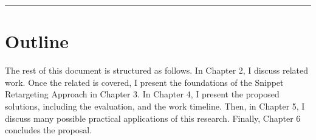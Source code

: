 \fancybreak{\pfbreakdisplay}

\section{Outline}
\label{sec:outline}

The rest of this document is structured as follows. In Chapter 2, I discuss related work.
Once the related is covered, I present the foundations of the Snippet Retargeting Approach in Chapter 3. In Chapter 4, I present the proposed solutions, including the evaluation, and the work timeline. Then, in Chapter 5, I discuss many possible practical applications of this research. Finally, Chapter 6 concludes the proposal.